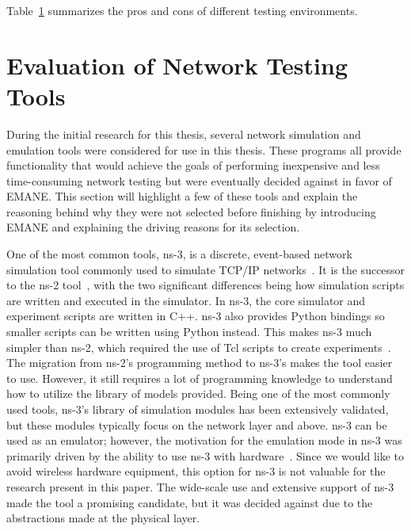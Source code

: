 \begin{table}[!ht]
\begin{adjustbox}{width=\textwidth, center=\textwidth}
\begin{tabular}{|l|l|l|}
			\hline
		\end{tabular}
	\end{adjustbox}
	\label{simtable}
\end{table}

Table~\ref{simtable} summarizes the pros and cons of different testing environments.

\section{Evaluation of Network Testing Tools} %
During the initial research for this thesis, several network simulation and emulation tools were considered for use in this thesis.
These programs all provide functionality that would achieve the goals of performing inexpensive and less time-consuming network testing but were eventually decided against in favor of EMANE.
This section will highlight a few of these tools and explain the reasoning behind why they were not selected before finishing by introducing EMANE and explaining the driving reasons for its selection.\par

One of the most common tools, ns-3, is a discrete, event-based network simulation tool commonly used to simulate TCP/IP networks~\cite{ns3}.
It is the successor to the ns-2 tool~\cite{ns2}, with the two significant differences being how simulation scripts are written and executed in the simulator.
In ns-3, the core simulator and experiment scripts are written in C++. ns-3 also provides Python bindings so smaller scripts can be written using Python instead.
This makes ns-3 much simpler than ns-2, which required the use of Tcl scripts to create experiments~\cite{ns2_ns3}.
The migration from ns-2's programming method to ns-3's makes the tool easier to use. However, it still requires a lot of programming knowledge to understand how to utilize the library of models provided.
Being one of the most commonly used tools, ns-3's library of simulation modules has been extensively validated, but these modules typically focus on the network layer and above.
ns-3 can be used as an emulator; however, the motivation for the emulation mode in ns-3 was primarily driven by the ability to use ns-3 with hardware~\cite{ns3_orbit}.
Since we would like to avoid wireless hardware equipment, this option for ns-3 is not valuable for the research present in this paper.
The wide-scale use and extensive support of ns-3 made the tool a promising candidate, but it was decided against due to the abstractions made at the physical layer.\par

